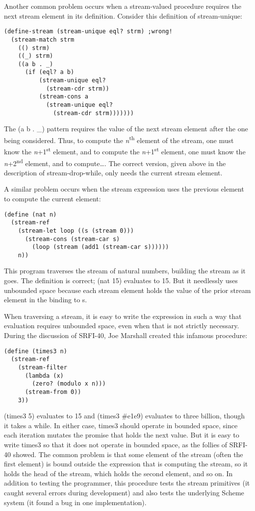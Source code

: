 Another common problem occurs when a stream-valued procedure requires
the next stream element in its definition. Consider this definition of
stream-unique:

\begin{verbatim}
(define-stream (stream-unique eql? strm) ;wrong!
  (stream-match strm
    (() strm)
    ((_) strm)
    ((a b . _)
      (if (eql? a b)
          (stream-unique eql?
            (stream-cdr strm))
          (stream-cons a
            (stream-unique eql?
              (stream-cdr strm)))))))
\end{verbatim}

The (a b . \_) pattern requires the value of the next stream element
after the one being considered. Thus, to compute the
\emph{n}\textsuperscript{th} element of the stream, one must know the
\emph{n}+1\textsuperscript{st} element, and to compute the
\emph{n}+1\textsuperscript{st} element, one must know the
\emph{n}+2\textsuperscript{nd} element, and to compute\ldots{}. The
correct version, given above in the description of stream-drop-while,
only needs the current stream element.

A similar problem occurs when the stream expression uses the previous
element to compute the current element:

\begin{verbatim}
(define (nat n)
  (stream-ref
    (stream-let loop ((s (stream 0)))
      (stream-cons (stream-car s)
        (loop (stream (add1 (stream-car s))))))
    n))
\end{verbatim}

This program traverses the stream of natural numbers, building the
stream as it goes. The definition is correct; (nat 15) evaluates to 15.
But it needlessly uses unbounded space because each stream element holds
the value of the prior stream element in the binding to s.

When traversing a stream, it is easy to write the expression in such a
way that evaluation requires unbounded space, even when that is not
strictly necessary. During the discussion of SRFI-40, Joe Marshall
created this infamous procedure:

\begin{verbatim}
(define (times3 n)
  (stream-ref
    (stream-filter
      (lambda (x)
        (zero? (modulo x n)))
      (stream-from 0))
    3))
\end{verbatim}

(times3 5) evaluates to 15 and (times3 \#e1e9) evaluates to three
billion, though it takes a while. In either case, times3 should operate
in bounded space, since each iteration mutates the promise that holds
the next value. But it is easy to write times3 so that it does not
operate in bounded space, as the follies of SRFI-40 showed. The common
problem is that some element of the stream (often the first element) is
bound outside the expression that is computing the stream, so it holds
the head of the stream, which holds the second element, and so on. In
addition to testing the programmer, this procedure tests the stream
primitives (it caught several errors during development) and also tests
the underlying Scheme system (it found a bug in one implementation).

